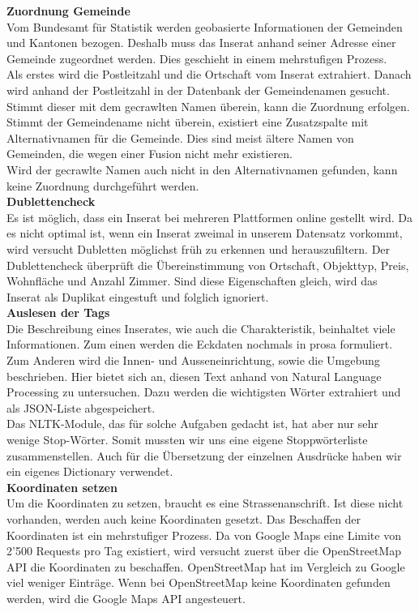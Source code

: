 \textbf{Zuordnung Gemeinde}\\
Vom Bundesamt für Statistik werden geobasierte Informationen der Gemeinden und Kantonen bezogen. Deshalb muss das Inserat anhand seiner Adresse einer Gemeinde zugeordnet werden. Dies geschieht in einem mehrstufigen Prozess.\\
Als erstes wird die Postleitzahl und die Ortschaft vom Inserat extrahiert. Danach wird anhand der Postleitzahl in der Datenbank der Gemeindenamen gesucht. Stimmt dieser mit dem gecrawlten Namen überein, kann die Zuordnung erfolgen.\\
Stimmt der Gemeindename nicht überein, existiert eine Zusatzspalte mit Alternativnamen für die Gemeinde.  Dies sind meist ältere Namen von Gemeinden, die wegen einer Fusion nicht mehr existieren.\\
Wird der gecrawlte Namen auch nicht in den Alternativnamen gefunden, kann keine Zuordnung durchgeführt werden.\\[2ex]
%
\textbf{Dublettencheck}\\
Es ist möglich, dass ein Inserat bei mehreren Plattformen online gestellt wird. Da es nicht optimal ist, wenn ein Inserat zweimal in unserem Datensatz vorkommt, wird versucht Dubletten möglichst früh zu erkennen und herauszufiltern. Der Dublettencheck überprüft die Übereinstimmung von Ortschaft, Objekttyp, Preis, Wohnfläche und Anzahl Zimmer. Sind diese Eigenschaften gleich, wird das Inserat als Duplikat eingestuft und folglich ignoriert.\\[2ex]
%
\textbf{Auslesen der Tags}\\
Die Beschreibung eines Inserates, wie auch die Charakteristik, beinhaltet viele Informationen. Zum einen werden die Eckdaten nochmals in prosa formuliert. Zum Anderen wird die Innen- und Ausseneinrichtung, sowie die Umgebung beschrieben. Hier bietet sich an, diesen Text anhand von Natural Language Processing zu untersuchen. Dazu werden die wichtigsten Wörter extrahiert und als JSON-Liste abgespeichert.\\
Das NLTK-Module, das für solche Aufgaben gedacht ist, hat aber nur sehr wenige Stop-Wörter. Somit mussten wir uns eine eigene Stoppwörterliste zusammenstellen. Auch für die Übersetzung der einzelnen Ausdrücke haben wir ein eigenes Dictionary verwendet.\\[2ex]
%
\textbf{Koordinaten setzen}\\
Um die Koordinaten zu setzen, braucht es eine Strassenanschrift. Ist diese nicht vorhanden, werden auch keine Koordinaten gesetzt. Das Beschaffen der Koordinaten ist ein mehrstufiger Prozess. Da von Google Maps eine Limite von 2'500 Requests pro Tag existiert, wird versucht zuerst über die OpenStreetMap API die Koordinaten zu beschaffen. OpenStreetMap hat im Vergleich zu Google viel weniger Einträge. Wenn bei OpenStreetMap keine Koordinaten gefunden werden, wird die Google Maps API angesteuert.\\[2ex]
